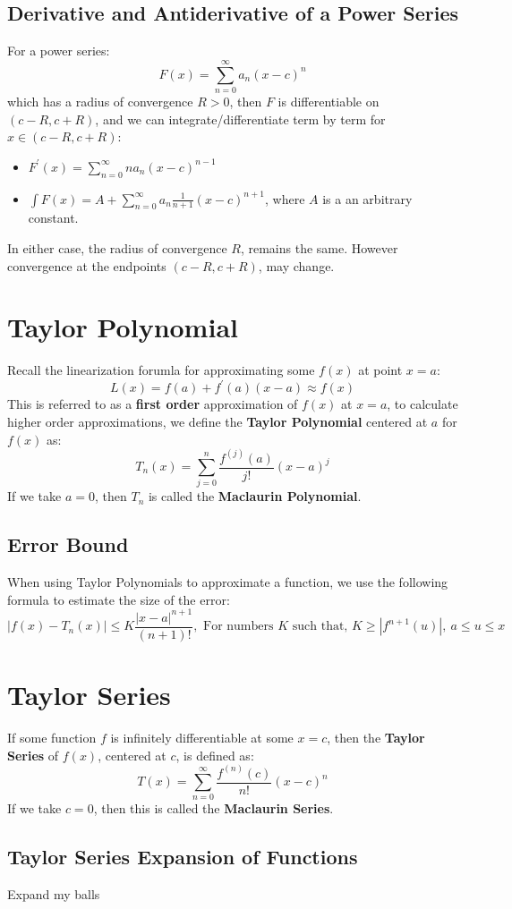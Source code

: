 \documentclass[a4paper]{article}
\begin{document}
  \subsection{Derivative and Antiderivative of a Power Series}
  For a power series:
  \[
    F(x) = \sum_{n=0}^\infty a_n (x-c)^n
  \]
  which has a radius of convergence $R>0$, then $F$ is differentiable on $(c-R, c+R)$, and we can integrate/differentiate term by term for $x \in (c-R,c+R)$:
  \begin{itemize}
    \item $F^\prime (x) = \sum_{n=0}^\infty n a_n(x-c)^{n-1}$
    \item $\int F (x) = A + \sum_{n=0}^\infty a_n \displaystyle\frac{1}{n+1}(x-c)^{n+1}$, where $A$ is a an arbitrary constant.
  \end{itemize}
  In either case, the radius of convergence $R$, remains the same. However convergence at the endpoints $(c-R, c+R)$, may change.
  \section{Taylor Polynomial}
  Recall the linearization forumla for approximating some $f(x)$ at point $x =a$:
  \[
    L(x) = f(a) + f^\prime(a)(x-a) \approx f(x)
  \]
  This is referred to as a \textbf{first order} approximation of $f(x)$ at $x=a$, to calculate higher order approximations, we define the \textbf{Taylor Polynomial} centered at $a$ for $f(x)$ as:
  \[
    T_n (x) = \sum_{j=0}^n \displaystyle\frac{f^{(j)} (a)}{j!} (x-a)^j
  \]
  If we take $a=0$, then $T_n$ is called the \textbf{Maclaurin Polynomial}.
  \subsection{Error Bound}
  When using Taylor Polynomials to approximate a function, we use the following formula to estimate the size of the error:
  \[
    |f(x) - T_n (x)| \leq K \frac{|x-a|^{n+1}}{(n+1)!},  \textrm{ For numbers $K$ such that, } K \geq |f^{n+1}(u)|, \ a \leq u \leq x
  \]
  \section{Taylor Series} 
  If some function $f$ is infinitely differentiable at some $x=c$, then the \textbf{Taylor Series} of $f(x)$, centered at $c$, is defined as:
  \[
    T(x) = \sum_{n=0}^\infty \frac{f^{(n)}(c)}{n!} (x-c)^n
  \]
  If we take $c=0$, then this is called the \textbf{Maclaurin Series}.
  \subsection{Taylor Series Expansion of Functions}
  Expand my balls 
\end{document}

